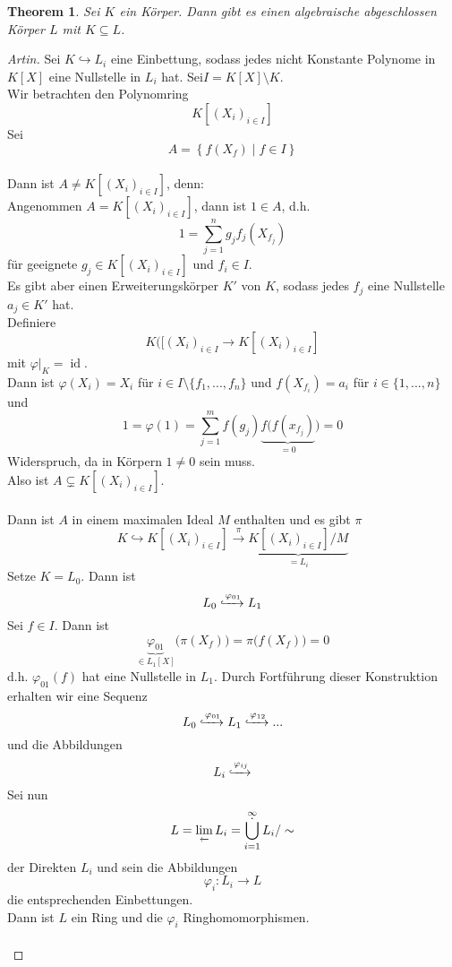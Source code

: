 \documentclass[10pt,a4paper]{article}
\newcommand{\id}{\operatorname{id}}
\renewcommand{\projlim}[1]{\lim\limits_{\overleftarrow{#1}}}
\theoremstyle{plain}
\newtheorem{theorem}{Theorem}[section]
\theoremstyle{definition}
\theoremstyle{remark}
\begin{document}
	\begin{theorem}
		Sei $K$ ein Körper. Dann gibt es einen algebraische abgeschlossen Körper $L$ mit $K\subseteq L$.
	\end{theorem}
	\begin{proof}[Artin]
		Sei $K\hookrightarrow L_i$ eine Einbettung, sodass jedes nicht Konstante Polynome in $K[X]$ eine Nullstelle in $L_i$ hat. Sei$I=K[X]\setminus K$.\\
		Wir betrachten den Polynomring
		\[K[(X_i)_{i\in I}]\]
		Sei
		\[A=\left\{f(X_f)\mid f\in I\right\}\]\\
		
		Dann ist $A\neq K[(X_i)_{i\in I}]$, denn:\\
		Angenommen $A=K[(X_i)_{i\in I}]$, dann ist $1\in A$, d.h.
		\[1=\sum_{j=1}^{n}g_jf_j(X_{f_j})\]
		für geeignete $g_j\in K[(X_i)_{i\in I}]$ und $f_i\in I$.\\
		Es gibt aber einen Erweiterungskörper $K'$ von $K$, sodass jedes $f_j$ eine Nullstelle $a_j\in K'$ hat.\\
		Definiere 
		\[K([(X_i)_{i\in I}\to K[(X_i)_{i\in I}]\]
		mit $\varphi|_K=\id$.\\
		Dann ist $\varphi(X_i)=X_i$ für $i\in I\setminus \{f_1,...,f_n\}$ und $f(X_{f_i})=a_i$ für $i\in\{1,...,n\}$ und
		\[1=\varphi(1)=\sum_{j=1}^{m}f(g_j)\underbrace{f\big(f(x_{f_j})}_{=0}\big)=0\]
		Widerspruch, da in Körpern $1\neq 0$ sein muss.\\
		Also ist $A\subsetneq K[(X_i)_{i\in I}]$.\\
		\\
		Dann ist $A$ in einem maximalen Ideal $M$ enthalten und es gibt $\pi$
		\[K\hookrightarrow K[(X_i)_{i\in I}]\xrightarrow{\pi}\underbrace{K[(X_i)_{i\in I}]/M}_{=L_i}\]
		Setze $K=L_0$. Dann ist
		\[L_0\xhookrightarrow{\varphi_{01}}L_1\]
		Sei $f\in I$. Dann ist
		\[\underbrace{\varphi_{01}}_{\in L_1[X]}\big(\pi(X_f)\big)=\pi\big(f(X_f)\big)=0\]
		d.h. $\varphi_{01}(f)$ hat eine Nullstelle in $L_1$. Durch Fortführung dieser Konstruktion erhalten wir eine Sequenz
		\[L_0\xhookrightarrow[]{\varphi_{01}}L_1\xhookrightarrow[]{\varphi_{12}}...\]
		und die Abbildungen
		\[L_i\xhookrightarrow[]{\varphi_{ij}}\]
		Sei nun
		\[L=\projlim{ }L_i=\operatornamewithlimits{\dot{\bigcup}}_{i=1}^\infty L_i/\sim\]
		der Direkten $L_i$ und sein die Abbildungen
		\[\varphi_i:L_i\to L\]
		die entsprechenden Einbettungen.\\
		Dann ist $L$ ein Ring und die $\varphi_i$ Ringhomomorphismen.\\
		\\

\end{proof}
\end{document}
